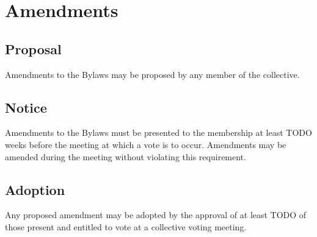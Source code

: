 \chapter{Amendments}

\section{Proposal}\label{sec:proposal}
Amendments to the Bylaws may be proposed by any member of the collective.

\section{Notice}\label{sec:notice}
Amendments to the Bylaws must be presented to the membership at least TODO weeks before the meeting at which a vote is to occur. Amendments may be amended during the meeting without violating this requirement.

\section{Adoption}\label{sec:adoption}
Any proposed amendment may be adopted by the approval of at least TODO of those present and entitled to vote at a collective voting meeting.
